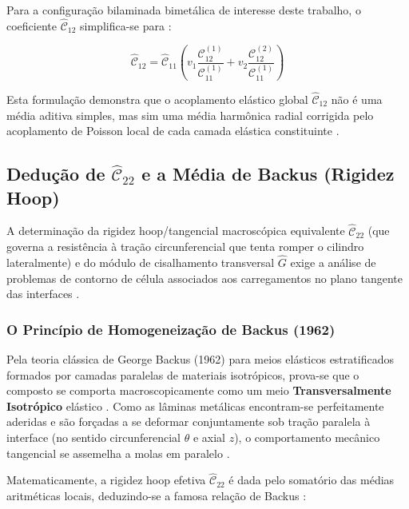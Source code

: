 Para a configuração bilaminada bimetálica de interesse deste trabalho, o coeficiente $\hat{\mathcal{C}}_{12}$ simplifica-se para \cite{PartonReport}:

\begin{equation}
  \hat{\mathcal{C}}_{12} = \hat{\mathcal{C}}_{11} \left( v_1 \frac{\mathcal{C}_{12}^{(1)}}{\mathcal{C}_{11}^{(1)}} + v_2 \frac{\mathcal{C}_{12}^{(2)}}{\mathcal{C}_{11}^{(1)}} \right)
  \label{eq:C12_bilaminado}
\end{equation}

Esta formulação demonstra que o acoplamento elástico global $\hat{\mathcal{C}}_{12}$ não é uma média aditiva simples, mas sim uma média harmônica radial corrigida pelo acoplamento de Poisson local de cada camada elástica constituinte \cite{Backus1962}.

\subsection{Dedução de $\hat{\mathcal{C}}_{22}$ e a Média de Backus (Rigidez Hoop)}

A determinação da rigidez hoop/tangencial macroscópica equivalente $\hat{\mathcal{C}}_{22}$ (que governa a resistência à tração circunferencial que tenta romper o cilindro lateralmente) e do módulo de cisalhamento transversal $\hat{G}$ exige a análise de problemas de contorno de célula associados aos carregamentos no plano tangente das interfaces \cite{Backus1962}.

\subsubsection{O Princípio de Homogeneização de Backus (1962)}

Pela teoria clássica de George Backus (1962) para meios elásticos estratificados formados por camadas paralelas de materiais isotrópicos, prova-se que o composto se comporta macroscopicamente como um meio \textbf{Transversalmente Isotrópico} elástico \cite{Backus1962}. Como as lâminas metálicas encontram-se perfeitamente aderidas e são forçadas a se deformar conjuntamente sob tração paralela à interface (no sentido circunferencial $\theta$ e axial $z$), o comportamento mecânico tangencial se assemelha a molas em paralelo \cite{Backus1962}.

Matematicamente, a rigidez hoop efetiva $\hat{\mathcal{C}}_{22}$ é dada pelo somatório das médias aritméticas locais, deduzindo-se a famosa relação de Backus \cite{Backus1962}:


